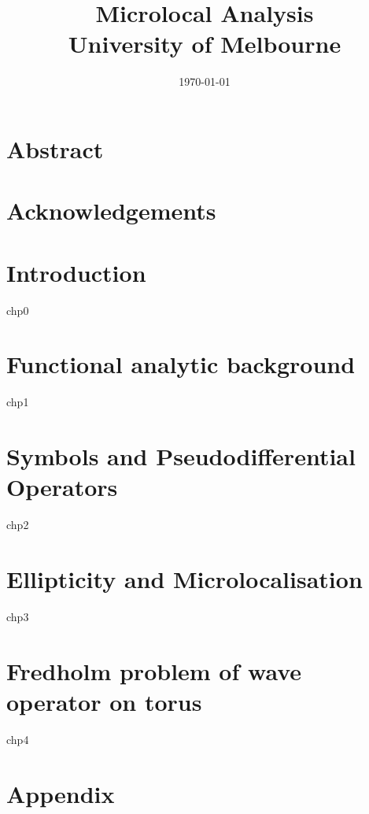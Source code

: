 \documentclass[12pt, twoside]{report}
\title{
    {Microlocal Analysis} \\
    {\large University of Melbourne}\\
}
\date{\today}
\begin{document}
\maketitle




\chapter*{Abstract}


\chapter*{Acknowledgements}

\tableofcontents
\chapter{Introduction}
{chp0}


\chapter{Functional analytic background}
{chp1}

\chapter{Symbols and Pseudodifferential Operators}
{chp2}

\chapter{Ellipticity and Microlocalisation}
{chp3}

\chapter{Fredholm problem of wave operator on torus}
{chp4}

\appendix
\chapter{Appendix}

%
\end{document}
